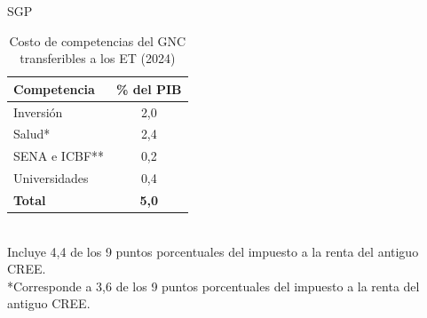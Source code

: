 \begin{frame}{SGP}
\begin{table}[h!]
\centering
\caption{Costo de competencias del GNC transferibles a los ET (2024)}
\begin{tabular}{|l|c|}
\hline
\textbf{Competencia} & \textbf{\% del PIB} \\
\hline
Inversión & 2,0 \\
Salud* & 2,4 \\
SENA e ICBF** & 0,2 \\
Universidades & 0,4 \\
\hline
\textbf{Total} & \textbf{5,0} \\
\hline
\end{tabular}
\end{table}
\vspace{0.1cm}
\\{\footnotesize *Incluye 4,4 de los 9 puntos porcentuales del impuesto a la renta del antiguo CREE.}\\
{\footnotesize **Corresponde a 3,6 de los 9 puntos porcentuales del impuesto a la renta del antiguo CREE.}
\end{frame}
